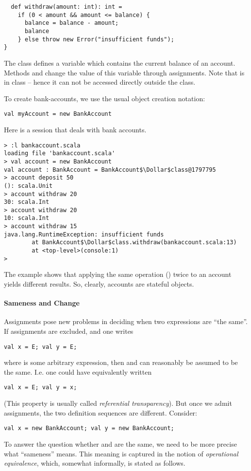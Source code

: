 {\begin{lstlisting}
  def withdraw(amount: int): int =
    if (0 < amount && amount <= balance) {
      balance = balance - amount;
      balance
    } else throw new Error("insufficient funds");
}
\end{lstlisting}
The class defines a variable  which contains the current
balance of an account. Methods  and 
change the value of this variable through assignments.  Note that
 is  in class  -- hence
it can not be accessed directly outside the class.

To create bank-accounts, we use the usual object creation notation:
\begin{lstlisting}
val myAccount = new BankAccount
\end{lstlisting}

\example Here is a  session that deals with bank
accounts.

\begin{lstlisting}
> :l bankaccount.scala
loading file 'bankaccount.scala'
> val account = new BankAccount
val account : BankAccount = BankAccount$\Dollar$class@1797795
> account deposit 50
(): scala.Unit
> account withdraw 20
30: scala.Int
> account withdraw 20
10: scala.Int
> account withdraw 15
java.lang.RuntimeException: insufficient funds
        at BankAccount$\Dollar$class.withdraw(bankaccount.scala:13)
        at <top-level>(console:1)
> 
\end{lstlisting}
The example shows that applying the same operation () twice to an account yields different results. So, clearly,
accounts are stateful objects.  

\paragraph{Sameness and Change}
Assignments pose new problems in deciding when two expressions are
``the same''.
If assignments are excluded, and one writes
\begin{lstlisting}
val x = E; val y = E;
\end{lstlisting}
where  is some arbitrary expression,
then  and  can reasonably be assumed to be the same.
I.e. one could have equivalently written
\begin{lstlisting}
val x = E; val y = x;
\end{lstlisting}
(This property is usually called {\em referential transparency}). But
once we admit assignments, the two definition sequences are different.
Consider:
\begin{lstlisting}
val x = new BankAccount; val y = new BankAccount;
\end{lstlisting}
To answer the question whether  and  are the same, we
need to be more precise what ``sameness'' means. This meaning is
captured in the notion of {\em operational equivalence}, which,
somewhat informally, is stated as follows.

}

